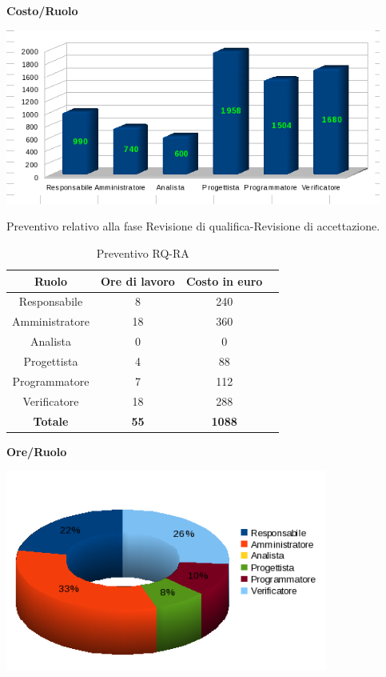 \begin{center}\textbf{Costo/Ruolo}
\end{center}
\includegraphics[width=350pt]{RPP_RQ_Costi}

\newpage

Preventivo relativo alla fase Revisione di qualifica-Revisione di accettazione.
\begin{table}[h]
	\begin{center}
		  \begin{tabular}{|c|c|c|c|}
		 \hline 
		 \textbf{Ruolo} & \textbf{Ore di lavoro} & \textbf{Costo in euro}\\
		 \hline
		Responsabile & 8 & 240 \\
		Amministratore & 18 & 360\\
		Analista & 0 & 0\\
		Progettista & 4 & 88\\
		Programmatore & 7 & 112 \\
		Verificatore & 18 & 288\\
        \hline
        \textbf{Totale} & \textbf{55} & \textbf{1088}\\
		\hline
		\end{tabular}
	\caption{Preventivo RQ-RA} 
	\label{tab:tabella_RQ-RA}
	\end{center}	
\end{table}



\begin{center}\textbf{Ore/Ruolo}
\end{center}
\includegraphics[width=300pt]{RQ_RA_Ore}

